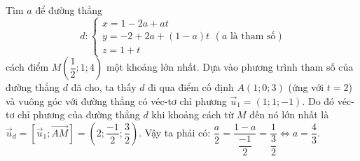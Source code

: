 \begin{vd}%
Tìm $a$ để đường thẳng 
\[d:\begin{cases}
x=1-2a+at\\
y=-2+2a+(1-a)t\\
z=1+t
\end{cases} (a \textrm{ là tham số})\]
cách điểm $M\left(\dfrac{1}{2};1;4\right)$ một khoảng lớn nhất. 
\loigiai
{
Dựa vào phương trình tham số của đường thẳng $d$ đã cho, ta thấy $d$ đi qua điểm cố định $A(1;0;3)$ (ứng với $t=2$) và vuông góc với đường thẳng có véc-tơ chỉ phương $\vec{u}_1=(1;1;-1)$. Do đó véc-tơ chỉ phương của đường thẳng $d$ khi khoảng cách từ $M$ đến nó lớn nhất là 
$\vec{u}_d=\left[\vec{u}_1; \vec{AM}\right]=\left(2;\dfrac{-1}{2};\dfrac{3}{2}\right)$. \newline
Vậy ta phải có: $\dfrac{a}{2}=\dfrac{1-a}{\dfrac{-1}{2}}=\dfrac{1}{\dfrac{3}{2}}\Leftrightarrow a=\dfrac{4}{3}$.
}
\end{vd} 
